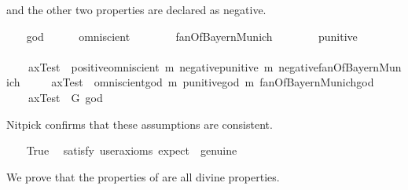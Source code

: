 \begin{isabellebody}
\begin{isamarkuptext}
and the other two properties are declared as negative.%
\end{isamarkuptext}%
\isamarkuptrue%
\ \ \isamarkupfalse%
\ god{}\ {\isacharcolon}{\isacharcolon}\ {\isachardoublequoteopen}{\isasymmu}{\isachardoublequoteclose}\isanewline
\ \ \isamarkupfalse%
\ omniscient\ {\isacharcolon}{\isacharcolon}\ {\isachardoublequoteopen}{\isasymmu}\ {\isasymRightarrow}\ {\isasymsigma}{\isachardoublequoteclose}\isanewline
\ \ \isamarkupfalse%
\ fanOfBayernMunich\ {\isacharcolon}{\isacharcolon}\ {\isachardoublequoteopen}{\isasymmu}\ {\isasymRightarrow}\ {\isasymsigma}{\isachardoublequoteclose}\isanewline
\ \ \isamarkupfalse%
\ punitive\ {\isacharcolon}{\isacharcolon}\ {\isachardoublequoteopen}{\isasymmu}\ {\isasymRightarrow}\ {\isasymsigma}{\isachardoublequoteclose}\isanewline
\ \ \isanewline
\ \ \isamarkupfalse%
\ \isanewline
\ \ \ \ axTest{}\ {\isacharcolon}\ {\isachardoublequoteopen}{\isacharbrackleft}positive{\isacharparenleft}omniscient{\isacharparenright}\ m{\isasymand}\ negative{\isacharparenleft}punitive{\isacharparenright}\ m{\isasymand}\ negative{\isacharparenleft}fanOfBayernMunich{\isacharparenright}{\isacharbrackright}{\isachardoublequoteclose}\ \isanewline
\ \ \ \ axTest{}\ {\isacharcolon}\ {\isachardoublequoteopen}{\isacharbrackleft}omniscient{\isacharparenleft}god{}{\isacharparenright}\ m{\isasymand}\ punitive{\isacharparenleft}god{}{\isacharparenright}\ m{\isasymand}\ fanOfBayernMunich{\isacharparenleft}god{}{\isacharparenright}{\isacharbrackright}{\isachardoublequoteclose}\ \isanewline
\ \ \ \ axTest{}\ {\isacharcolon}\ {\isachardoublequoteopen}{\isacharbrackleft}G\ god{}{\isacharbrackright}{\isachardoublequoteclose}%
\begin{isamarkuptext}%
Nitpick confirms that these assumptions are consistent.%
\end{isamarkuptext}%
\isamarkuptrue%
\ \ \isamarkupfalse%
\ True\ \isamarkupfalse%
\ {\isacharbrackleft}satisfy{\isacharcomma}\ user{\isacharunderscore}axioms{\isacharcomma}\ expect\ {\isacharequal}\ genuine{\isacharbrackright}%
\isadelimproof
\ %
\endisadelimproof
%
\isatagproof
{}\isamarkupfalse%
%
\endisatagproof
{\isafoldproof}%
%
\isadelimproof
%
\endisadelimproof
%
\begin{isamarkuptext}%
We prove that the properties of  are all divine properties.%

\end{isamarkuptext}
\end{isabellebody}
